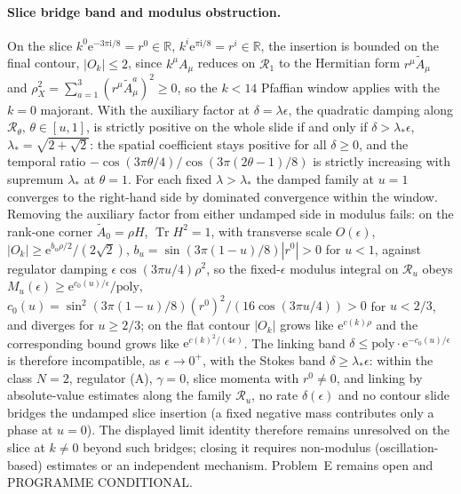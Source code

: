 \paragraph{Slice bridge band and modulus obstruction.} On the slice \(k^0\mathrm e^{-3\pi\mathrm i/8}=r^0\in\mathbb R\), \(k^i\mathrm e^{\pi\mathrm i/8}=r^i\in\mathbb R\), the insertion is bounded on the final contour, \(|O_k|\le2\), since \(k^\mu A_\mu\) reduces on \(\mathcal R_1\) to the Hermitian form \(r^\mu\tilde A_\mu\) and \(\rho_X^2=\sum_{a=1}^{3}(r^\mu\tilde A^a_\mu)^2\ge0\), so the \(k<14\) Pfaffian window applies with the \(k=0\) majorant. With the auxiliary factor at \(\delta=\lambda\epsilon\), the quadratic damping along \(\mathcal R_\theta\), \(\theta\in[u,1]\), is strictly positive on the whole slide if and only if \(\delta>\lambda_*\epsilon\), \(\lambda_*=\sqrt{2+\sqrt2}\): the spatial coefficient stays positive for all \(\delta\ge0\), and the temporal ratio \(-\cos(3\pi\theta/4)/\cos(3\pi(2\theta-1)/8)\) is strictly increasing with supremum \(\lambda_*\) at \(\theta=1\). For each fixed \(\lambda>\lambda_*\) the damped family at \(u=1\) converges to the right-hand side by dominated convergence within the window. Removing the auxiliary factor from either undamped side in modulus fails: on the rank-one corner \(\tilde A_0=\rho H\), \(\operatorname{Tr}H^2=1\), with transverse scale \(O(\epsilon)\), \(|O_k|\ge\mathrm e^{b_u\rho/2}/(2\sqrt2)\), \(b_u=\sin(3\pi(1-u)/8)|r^0|>0\) for \(u<1\), against regulator damping \(\epsilon\cos(3\pi u/4)\rho^2\), so the fixed-\(\epsilon\) modulus integral on \(\mathcal R_u\) obeys \(M_u(\epsilon)\ge\mathrm e^{c_0(u)/\epsilon}/\mathrm{poly}\), \(c_0(u)=\sin^2(3\pi(1-u)/8){(r^0)}^2/(16\cos(3\pi u/4))>0\) for \(u<2/3\), and diverges for \(u\ge2/3\); on the flat contour \(|O_k|\) grows like \(\mathrm e^{c(k)\rho}\) and the corresponding bound grows like \(\mathrm e^{c(k)^2/(4\epsilon)}\). The linking band \(\delta\le\mathrm{poly}\cdot\mathrm e^{-c_0(u)/\epsilon}\) is therefore incompatible, as \(\epsilon\to0^+\), with the Stokes band \(\delta\ge\lambda_*\epsilon\): within the class \(N=2\), regulator (A), \(\gamma=0\), slice momenta with \(r^0\ne0\), and linking by absolute-value estimates along the family \(\mathcal R_u\), no rate \(\delta(\epsilon)\) and no contour slide bridges the undamped slice insertion (a fixed negative mass contributes only a phase at \(u=0\)). The displayed limit identity therefore remains unresolved on the slice at \(k\ne0\) beyond such bridges; closing it requires non-modulus (oscillation-based) estimates or an independent mechanism. Problem~E remains open and PROGRAMME CONDITIONAL.


